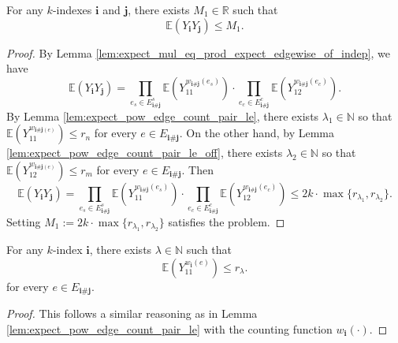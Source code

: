 \begin{lemma}
  \notready
  \label{lem:expect_mul_le_const}
  For any $k$-indexes $\mathbf{i}$ and $\mathbf{j}$, there exists $M_1 \in \mathbb{R}$ such that
  \[
  \mathbb{E} (Y_\mathbf{i}Y_\mathbf{j}) \leq M_1.
  \]
\end{lemma}

\begin{proof}
  By Lemma \ref{lem:expect_mul_eq_prod_expect_edgewise_of_indep}, we have
  \[
  \mathbb{E} (Y_\mathbf{i}Y_\mathbf{j})
  = \prod_{e_s \in E^s_{\mathbf{i} \# \mathbf{j}}} \mathbb{E} (Y_{11}^{w_{\mathbf{i} \# \mathbf{j}}(e_s)}) \cdot \prod_{e_c \in E^c_{\mathbf{i} \# \mathbf{j}}} \mathbb{E} (Y_{12}^{w_{\mathbf{i} \# \mathbf{j}}(e_c)}).
  \]
  By Lemma \ref{lem:expect_pow_edge_count_pair_le}, there exists $\lambda_1 \in \mathbb{N}$ so that $\mathbb{E} (Y_{11}^{w_{\mathbf{i} \# \mathbf{j} (e)}}) \leq r_n$ for every $e \in E_{\mathbf{i} \# \mathbf{j}}$.
  On the other hand, by Lemma \ref{lem:expect_pow_edge_count_pair_le_off}, there exists $\lambda_2 \in \mathbb{N}$ so that $\mathbb{E} (Y_{12}^{w_{\mathbf{i} \# \mathbf{j} (e)}}) \leq r_m$ for every $e \in E_{\mathbf{i} \# \mathbf{j}}$.
  Then
  \[ \mathbb{E} (Y_\mathbf{i}Y_\mathbf{j})
  = \prod_{e_s \in E^s_{\mathbf{i} \# \mathbf{j}}} \mathbb{E} (Y_{11}^{w_{\mathbf{i} \# \mathbf{j}}(e_s)}) \cdot \prod_{e_c \in E^c_{\mathbf{i} \# \mathbf{j}}} \mathbb{E} (Y_{12}^{w_{\mathbf{i} \# \mathbf{j}}(e_c)})
  \leq 2k \cdot \max\{r_{\lambda_1},r_{\lambda_2}\}.
  \]
  Setting $M_1 := 2k \cdot \max\{r_{\lambda_1},r_{\lambda_2}\}$ satisfies the problem.
\end{proof}


\begin{lemma}
  \notready
  \label{lem:expect_pow_edge_count_le}
  For any $k$-index $\mathbf{i}$, there exists $\lambda \in \mathbb{N}$ such that
  \[
  \mathbb{E} (Y_{11}^{w_{\mathbf{i}}(e)}) \leq r_\lambda.
  \]
  for every $e \in E_{\mathbf{i} \# \mathbf{j}}$.
\end{lemma}

\begin{proof}
  This follows a similar reasoning as in Lemma \ref{lem:expect_pow_edge_count_pair_le} with the counting function $w_\mathbf{i}(\cdot)$.
\end{proof}


